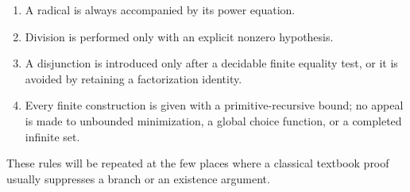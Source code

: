 \begin{enumerate}
\item A radical is always accompanied by its power equation.
\item Division is performed only with an explicit nonzero hypothesis.
\item A disjunction is introduced only after a decidable finite equality test,
  or it is avoided by retaining a factorization identity.
\item Every finite construction is given with a primitive-recursive bound;
  no appeal is made to unbounded minimization, a global choice function, or a
  completed infinite set.
\end{enumerate}

These rules will be repeated at the few places where a classical textbook
proof usually suppresses a branch or an existence argument.
